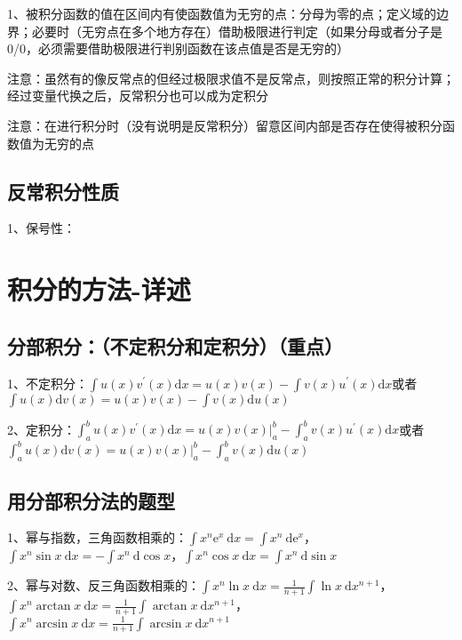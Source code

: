 1、被积分函数的值在区间内有使函数值为无穷的点：分母为零的点；定义域的边界；必要时（无穷点在多个地方存在）借助极限进行判定（如果分母或者分子是0/0，必须需要借助极限进行判别函数在该点值是否是无穷的）

注意：虽然有的像反常点的但经过极限求值不是反常点，则按照正常的积分计算；经过变量代换之后，反常积分也可以成为定积分

注意：在进行积分时（没有说明是反常积分）留意区间内部是否存在使得被积分函数值为无穷的点



\subsection{反常积分性质}

1、保号性：

\section{积分的方法-详述}



\subsection{分部积分：（不定积分和定积分）（重点）}

1、不定积分：$\int u(x) v^{\prime}(x) \mathrm{d} x=u(x) v(x)-\int v(x) u^{\prime}(x) \mathrm{d} x$或者$\int u(x) \mathrm{d} v(x)=u(x) v(x)-\int v(x) \mathrm{d} u(x)$

2、定积分：$\int_{a}^{b} u(x) v^{\prime}(x) \mathrm{d} x=\left.u(x) v(x)\right|_{a} ^{b}-\int_{a}^{b} v(x) u^{\prime}(x) \mathrm{d} x$或者$\int_{a}^{b} u(x) \mathrm{d} v(x)=\left.u(x) v(x)\right|_{a} ^{b}-\int_{a}^{b} v(x) \mathrm{d} u(x)$



\subsection{用分部积分法的题型}

1、幂与指数，三角函数相乘的：$\int x^{n} \mathrm{e}^{x} \mathrm{~d} x=\int x^{n} \mathrm{~d} \mathrm{e}^{x}$，$\int x^{n} \sin x \mathrm{~d} x=-\int x^{n} \mathrm{~d} \cos x$，$\int x^{n} \cos x \mathrm{~d} x=\int x^{n} \mathrm{~d} \sin x$

2、幂与对数、反三角函数相乘的：$\int x^{n} \ln x \mathrm{~d} x=\frac{1}{n+1} \int \ln x \mathrm{~d} x^{n+1}$，$\int x^{n} \arctan x \mathrm{~d} x=\frac{1}{n+1} \int \arctan x \mathrm{~d} x^{n+1}$，$\int x^{n} \arcsin x \mathrm{~d} x=\frac{1}{n+1} \int \arcsin x \mathrm{~d} x^{n+1}$

